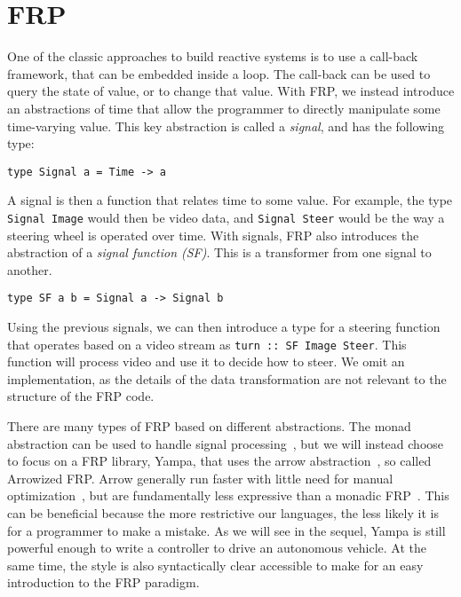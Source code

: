 \section{FRP}

One of the classic approaches to build reactive systems is to use a call-back framework, that can be embedded inside a loop.
The call-back can be used to query the state of value, or to change that value.
With FRP, we instead introduce an abstractions of time that allow the programmer to directly manipulate some time-varying value.
This key abstraction is called a \textit{signal}, and has the following type:

\begin{lstlisting}
type Signal a = Time -> a
\end{lstlisting}

A signal is then a function that relates time to some value.
For example, the type \texttt{Signal Image} would then be video data, and \texttt{Signal Steer} would be the way a steering wheel is operated over time.
With signals, FRP also introduces the abstraction of a \textit{signal function (SF)}.
This is a transformer from one signal to another.

\begin{lstlisting}
type SF a b = Signal a -> Signal b
\end{lstlisting}

Using the previous signals, we can then introduce a type for a steering function that operates based on a video stream as \texttt{turn :: SF Image Steer}.
This function will process video and use it to decide how to steer.
We omit an implementation, as the details of the data transformation are not relevant to the structure of the FRP code.

There are many types of FRP based on different abstractions.
The monad abstraction can be used to handle signal processing~\cite{van2014monadic},
 but we will instead choose to focus on a FRP library, Yampa, that uses the arrow abstraction~\cite{hudak2003arrows}, so called Arrowized FRP.
Arrow generally run faster with little need for manual optimization~\cite{yallop2016causal}, but are fundamentally less expressive than a monadic FRP~\cite{lindley2011idioms}.
This can be beneficial because the more restrictive our languages, the less likely it is for a programmer to make a mistake.
As we will see in the sequel, Yampa is still powerful enough to write a controller to drive an autonomous vehicle.
At the same time, the style is also syntactically clear accessible to make for an easy introduction to the FRP paradigm.

